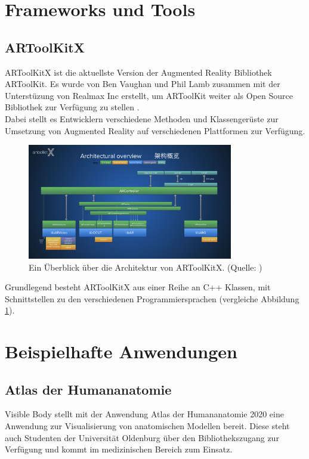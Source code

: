 \section{Frameworks und Tools}

\subsection{ARToolKitX}
ARToolKitX ist die aktuellste Version der Augmented Reality Bibliothek ARToolKit. Es wurde von Ben Vaughan und Phil Lamb zusammen mit der Unterstüzung von Realmax Inc erstellt, um ARToolKit weiter als Open Source Bibliothek zur Verfügung zu stellen \citep{artoolkitx:startseite}. \\
Dabei stellt es Entwicklern verschiedene Methoden und Klassengerüste zur Umsetzung von Augmented Reality auf verschiedenen Plattformen zur Verfügung.\\
\begin{figure}
\centering
\includegraphics[width=0.8\textwidth]{Abbildungen/artoolkitx-architecture.png}
\caption[ARToolKitX Architektur]{Ein Überblick über die Architektur von ARToolKitX. (Quelle: \cite{artoolkitx:architecture})}
\label{fig:artoolkitx-architecture}
\end{figure}
Grundlegend besteht ARToolKitX aus einer Reihe an C++ Klassen, mit Schnittstellen zu den verschiedenen Programmiersprachen (vergleiche Abbildung \ref{fig:artoolkitx-architecture}).


\section{Beispielhafte Anwendungen}

\subsection{Atlas der Humananatomie}\label{sec:atlas-humananatomie}
Visible Body stellt mit der Anwendung \glqq Atlas der Humananatomie 2020\grqq{} eine Anwendung zur Visualisierung von anatomischen Modellen bereit.  Diese steht auch Studenten der Universität Oldenburg über den Bibliothekszugang zur Verfügung und kommt im medizinischen Bereich zum Einsatz. \\
